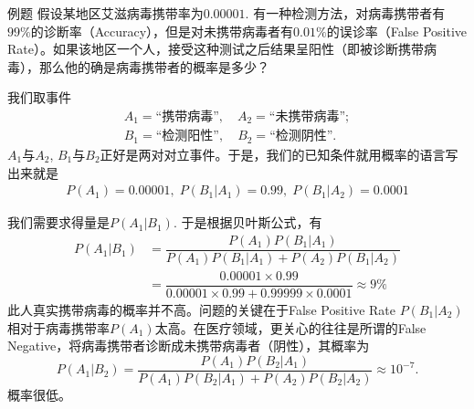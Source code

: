 \documentclass[10pt]{beamer}
\begin{document}

\begin{frame}

\begin{block}{例题}
假设某地区艾滋病毒携带率为$0.00001$. 有一种检测方法，对病毒携带者有$99\%$的诊断率（Accuracy），但是对未携带病毒者有$0.01\%$的误诊率（False Positive Rate）。如果该地区一个人，接受这种测试之后结果呈阳性（即被诊断携带病毒），那么他的确是病毒携带者的概率是多少？
\end{block}

\vspace{1em}
\pause

我们取事件
\begin{gather*}
A_1 = \text{``携带病毒''}, \quad A_2 = \text{``未携带病毒''}; \\
B_1 = \text{``检测阳性''}, \quad B_2 = \text{``检测阴性''}.
\end{gather*}
$A_1$与$A_2$, $B_1$与$B_2$正好是两对对立事件。于是，我们的已知条件就用概率的语言写出来就是
\begin{gather*}
P(A_1) = 0.00001,\; P(B_1|A_1) = 0.99,\; P(B_1|A_2) = 0.0001
\end{gather*}
\end{frame}


\begin{frame}

我们需要求得量是$P(A_1|B_1)$. 于是根据贝叶斯公式，有
\begin{align*}
P(A_1|B_1) & = \dfrac{P(A_1)P(B_1|A_1)}{P(A_1)P(B_1|A_1) + P(A_2)P(B_1|A_2)} \\
& = \dfrac{0.00001\times 0.99}{0.00001\times 0.99 + 0.99999\times 0.0001} \approx 9\%
\end{align*}
此人真实携带病毒的概率并不高。问题的关键在于False Positive Rate $P(B_1|A_2)$相对于病毒携带率$P(A_1)$太高。在医疗领域，更关心的往往是所谓的False Negative，将病毒携带者诊断成未携带病毒者（阴性），其概率为
$$P(A_1|B_2) = \dfrac{P(A_1)P(B_2|A_1)}{P(A_1)P(B_2|A_1) + P(A_2)P(B_2|A_2)} \approx 10^{-7}.$$
概率很低。

\end{frame}




\end{document}
